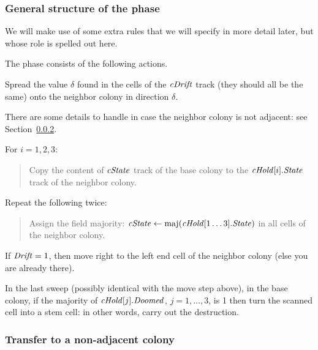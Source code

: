 \documentclass[12pt]{memoir}
\newcommand{\fld}[1]{\ensuremath{\textit{#1\/}}}
\newcommand{\maj}{\mathrm{maj}}
\newcommand{\Drift}{\fld{Drift}}
\newcommand{\Doomed}{\fld{Doomed}}
\newcommand{\cDrift}{\fld{cDrift}}
\newcommand{\cHold}{\fld{cHold}}
\newcommand{\State}{\fld{State}}
\newcommand{\cState}{\fld{cState}}
\begin{document}
\subsubsection{General structure of the phase}\label{sec:TransferPhase.general-struc}

We will make use of some extra rules that we will
specify in more detail later, but whose role is spelled out here.

The phase consists of the following actions.
\begin{enumerate}
\item
  Spread the value \( \delta \) found in the cells of the \( \cDrift \) track
  (they should all be the same)
  onto the neighbor colony in direction \( \delta \).

There are some details to handle in case the neighbor colony is not adjacent:
see Section~\ref{sec:adjacency}.

\item\label{i:transfer-state} For \( i=1,2,3 \):
        \begin{quote}
          Copy the content of \( \cState \) track of the base colony
            to the \( \cHold[i].\State \) track of the neighbor colony.
        \end{quote}

\item Repeat the following twice:
  \begin{quote}
 Assign the field majority: \( \cState\gets \maj(\cHold[1 \dots  3].\State) \)
in all cells of the neighbor colony.    
  \end{quote}
  
\item If \( \Drift = 1 \), then move right to the left end cell of the neighbor colony
(else you are already there).

        \begin{sloppypar}
          \item In the last sweep (possibly identical with the move step above), 
            in the base colony, if the majority of \( \cHold[j].\Doomed \), \( j=1,\dots,3 \), 
            is 1 then turn the scanned cell into a stem cell: 
            in other words, carry out the destruction.
          \end{sloppypar}


\end{enumerate}

\subsubsection{Transfer to a non-adjacent colony}\label{sec:adjacency}
\end{document}
